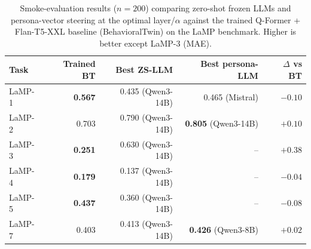 \begin{table}[h]
\centering\small
\caption{Smoke-evaluation results ($n{=}200$) comparing zero-shot
frozen LLMs and persona-vector steering at the optimal layer/$\alpha$
against the trained Q-Former + Flan-T5-XXL baseline (BehavioralTwin) on
the LaMP benchmark. Higher is better except LaMP-3 (MAE).}
\label{tab:main_results}
\begin{tabular}{lrrrr}
\toprule
Task    & Trained BT & Best ZS-LLM & Best persona-LLM & $\Delta$ vs BT \\
\midrule
LaMP-1  & \textbf{0.567} & 0.435 (Qwen3-14B)         & 0.465 (Mistral)            & $-0.10$ \\
LaMP-2  & 0.703          & 0.790 (Qwen3-14B)         & \textbf{0.805} (Qwen3-14B) & $+0.10$ \\
LaMP-3  & \textbf{0.251} & 0.630 (Qwen3-14B)         & --                         & $+0.38$ \\
LaMP-4  & \textbf{0.179} & 0.137 (Qwen3-14B)         & --                         & $-0.04$ \\
LaMP-5  & \textbf{0.437} & 0.360 (Qwen3-14B)         & --                         & $-0.08$ \\
LaMP-7  & 0.403          & 0.413 (Qwen3-14B)         & \textbf{0.426} (Qwen3-8B)  & $+0.02$ \\
\bottomrule
\end{tabular}
\end{table}
